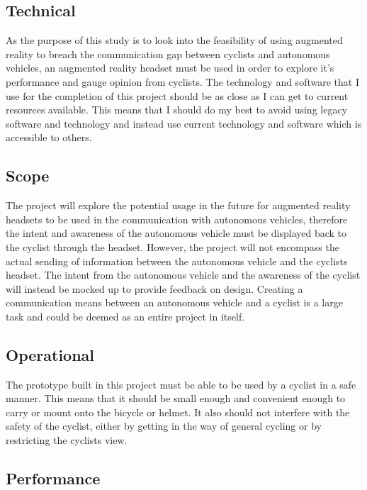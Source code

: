 \documentclass{l4proj}
\begin{document}
\subsection{Technical}

As the purpose of this study is to look into the feasibility of using augmented reality to breach the communication gap between cyclists and autonomous vehicles, an augmented reality headset must be used in order to explore it's performance and gauge opinion from cyclists. The technology and software that I use for the completion of this project should be as close as I can get to current resources available. This means that I should do my best to avoid using legacy software and technology and instead use current technology and software which is accessible to others.

\subsection{Scope}

The project will explore the potential usage in the future for augmented reality headsets to be used in the communication with autonomous vehicles, therefore the intent and awareness of the autonomous vehicle must be displayed back to the cyclist through the headset. However, the project will not encompass the actual sending of information between the autonomous vehicle and the cyclists headset. The intent from the autonomous vehicle and the awareness of the cyclist will instead be mocked up to provide feedback on design. Creating a communication means between an autonomous vehicle and a cyclist is a large task and could be deemed as an entire project in itself.

\subsection{Operational}

The prototype built in this project must be able to be used by a cyclist in a safe manner. This means that it should be small enough and convenient enough to carry or mount onto the bicycle or helmet. It also should not interfere with the safety of the cyclist, either by getting in the way of general cycling or by restricting the cyclists view.

\subsection{Performance}
\end{document}
